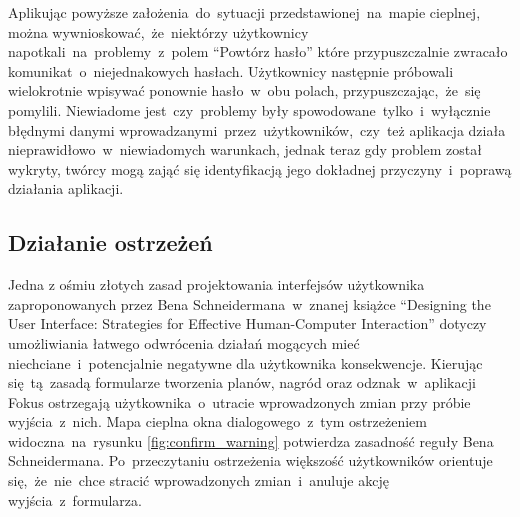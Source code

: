 Aplikując powyższe założenia~do~sytuacji przedstawionej~na~mapie cieplnej, można wywnioskować,~że~niektórzy użytkownicy napotkali~na~problemy~z~polem ``Powtórz hasło'' które przypuszczalnie zwracało komunikat~o~niejednakowych hasłach. Użytkownicy następnie próbowali wielokrotnie wpisywać ponownie hasło~w~obu polach, przypuszczając,~że~się pomylili. Niewiadome jest~czy~problemy były spowodowane~tylko~i~wyłącznie błędnymi danymi wprowadzanymi~przez~użytkowników,~czy~też aplikacja działa nieprawidłowo~w~niewiadomych warunkach, jednak teraz gdy problem został wykryty, twórcy mogą zająć się identyfikacją jego dokładnej przyczyny~i~poprawą działania aplikacji.

\bigskip
{}

\subsection{Działanie ostrzeżeń}
Jedna z ośmiu złotych zasad projektowania interfejsów użytkownika zaproponowanych przez Bena Schneidermana~w~znanej książce ``Designing the User Interface: Strategies for Effective Human-Computer Interaction'' \cite{Designing_IU} dotyczy umożliwiania łatwego odwrócenia działań mogących mieć niechciane~i~potencjalnie negatywne dla użytkownika konsekwencje. Kierując się~tą~zasadą formularze tworzenia planów, nagród oraz odznak~w~aplikacji Fokus ostrzegają użytkownika~o~utracie wprowadzonych zmian przy próbie wyjścia~z~nich. Mapa cieplna okna dialogowego~z~tym ostrzeżeniem widoczna~na~rysunku \ref{fig:confirm_warning} potwierdza zasadność reguły Bena Schneidermana. Po~przeczytaniu ostrzeżenia większość użytkowników orientuje się,~że~nie~chce stracić wprowadzonych zmian~i~anuluje akcję wyjścia~z~formularza.

\bigskip
{}
